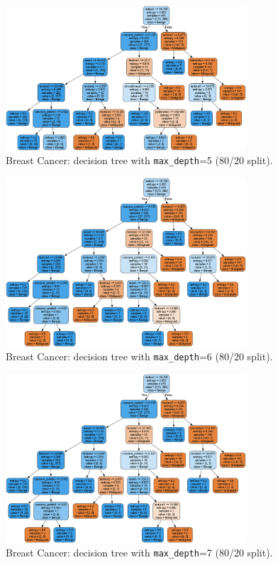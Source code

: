 \begin{figure}[H]
	\centering
	\includegraphics[width=0.8\textwidth]{imgs/dt/dt__breast_cancer__80_vs_20__5.png}
	\caption{Breast Cancer: decision tree with \texttt{max\_depth}=5 (80/20 split).}
	\label{fig:bc-dt-depth-5}
\end{figure}

\begin{figure}[H]
	\centering
	\includegraphics[width=0.8\textwidth]{imgs/dt/dt__breast_cancer__80_vs_20__6.png}
	\caption{Breast Cancer: decision tree with \texttt{max\_depth}=6 (80/20 split).}
	\label{fig:bc-dt-depth-6}
\end{figure}

\begin{figure}[H]
	\centering
	\includegraphics[width=0.8\textwidth]{imgs/dt/dt__breast_cancer__80_vs_20__7.png}
	\caption{Breast Cancer: decision tree with \texttt{max\_depth}=7 (80/20 split).}
	\label{fig:bc-dt-depth-7}
\end{figure}

